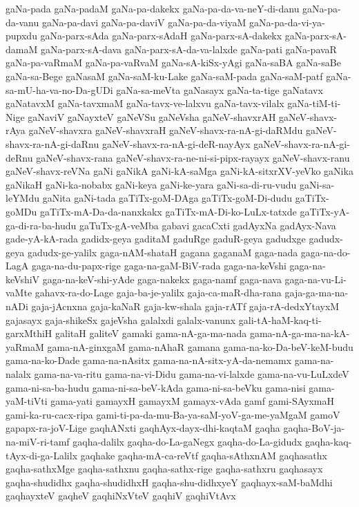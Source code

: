 {gaNa-pada
gaNa-padaM
gaNa-pa-dakekx
gaNa-pa-da-va-neY-di-danu
gaNa-pa-da-vanu
gaNa-pa-davi
gaNa-pa-daviV
gaNa-pa-da-viyaM
gaNa-pa-da-vi-ya-pupxdu
gaNa-parx-sAda
gaNa-parx-sAdaH
gaNa-parx-sA-dakekx
gaNa-parx-sA-damaM
gaNa-parx-sA-dava
gaNa-parx-sA-da-va-lalxde
gaNa-pati
gaNa-pavaR
gaNa-pa-vaRmaM
gaNa-pa-vaRvaM
gaNa-sA-kiSx-yAgi
gaNa-saBA
gaNa-saBe
gaNa-sa-Bege
gaNasaM
gaNa-saM-ku-Lake
gaNa-saM-pada
gaNa-saM-patf
gaNa-sa-mU-ha-va-no-Da-gUDi
gaNa-sa-meVta
gaNasayx
gaNa-ta-tige
gaNatavx
gaNatavxM
gaNa-tavxmaM
gaNa-tavx-ve-lalxvu
gaNa-tavx-vilalx
gaNa-tiM-ti-Nige
gaNaviV
gaNayxteV
gaNeVSu
gaNeVsha
gaNeV-shavxrAH
gaNeV-shavx-rAya
gaNeV-shavxra
gaNeV-shavxraH
gaNeV-shavx-ra-nA-gi-daRMdu
gaNeV-shavx-ra-nA-gi-daRnu
gaNeV-shavx-ra-nA-gi-deR-nayAyx
gaNeV-shavx-ra-nA-gi-deRnu
gaNeV-shavx-rana
gaNeV-shavx-ra-ne-ni-si-pipx-rayayx
gaNeV-shavx-ranu
gaNeV-shavx-reVNa
gaNi
gaNikA
gaNi-kA-saMga
gaNi-kA-sitxrXV-yeVko
gaNika
gaNikaH
gaNi-ka-nobabx
gaNi-keya
gaNi-ke-yara
gaNi-sa-di-ru-vudu
gaNi-sa-leYMdu
gaNita
gaNi-tada
gaTiTx-goM-DAga
gaTiTx-goM-Di-dudu
gaTiTx-goMDu
gaTiTx-mA-Da-da-nanxkakx
gaTiTx-mA-Di-ko-LuLx-tatxde
gaTiTx-yA-ga-di-ra-ba-hudu
gaTuTx-gA-veMba
gabavi
gacaCxti
gadAyxNa
gadAyx-Nava
gade-yA-kA-rada
gadidx-geya
gaditaM
gaduRge
gaduR-geya
gadudxge
gadudx-geya
gadudx-ge-yalilx
gaga-nAM-shataH
gagana
gaganaM
gaga-nada
gaga-na-do-LagA
gaga-na-du-papx-rige
gaga-na-gaM-BiV-rada
gaga-na-keVshi
gaga-na-keVshiV
gaga-na-keV-shi-yAde
gaga-nakekx
gaga-namf
gaga-nava
gaga-na-vu-Li-vaMte
gahavx-ra-do-Lage
gaja-ba-je-yalilx
gaja-ca-maR-dha-rana
gaja-ga-ma-na-nADi
gaja-jAcnxna
gaja-kaNaR
gaja-kw-shala
gaja-rATf
gaja-rA-dedxYtayxM
gajasayx
gaja-shikeSx
gajeVsha
galalxdi
galalx-vanunx
gali-tA-haM-kaq-ti-garxMthiH
galitaH
galiteV
gamaki
gama-nA-ga-ma-nada
gama-nA-ga-ma-na-kA-yaRmaM
gama-nA-ginxgaM
gama-nAhaR
gamana
gama-na-ko-Da-beV-keM-budu
gama-na-ko-Dade
gama-na-nAsitx
gama-na-nA-sitx-yA-da-nemamx
gama-na-nalalx
gama-na-va-ritu
gama-na-vi-Didu
gama-na-vi-lalxde
gama-na-vu-LuLxdeV
gama-ni-sa-ba-hudu
gama-ni-sa-beV-kAda
gama-ni-sa-beVku
gama-nisi
gama-yaM-tiVti
gama-yati
gamayxH
gamayxM
gamayx-vAda
gamf
gami-SAyxmaH
gami-ka-ru-cacx-ripa
gami-ti-pa-da-mu-Ba-ya-saM-yoV-ga-me-yaMgaM
gamoV
gapapx-ra-joV-Lige
gaqhANxti
gaqhAyx-dayx-dhi-kaqtaM
gaqha
gaqha-BoV-ja-na-miV-ri-tamf
gaqha-dalilx
gaqha-do-La-gaNegx
gaqha-do-La-gidudx
gaqha-kaq-tAyx-di-ga-Lalilx
gaqhake
gaqha-mA-ca-reVtf
gaqha-sAthxnAM
gaqhasathx
gaqha-sathxMge
gaqha-sathxnu
gaqha-sathx-rige
gaqha-sathxru
gaqhasayx
gaqha-shudidhx
gaqha-shudidhxH
gaqha-shu-didhxyeY
gaqhayx-saM-baMdhi
gaqhayxteV
gaqheV
gaqhiNxVteV
gaqhiV
gaqhiVtAvx
}
